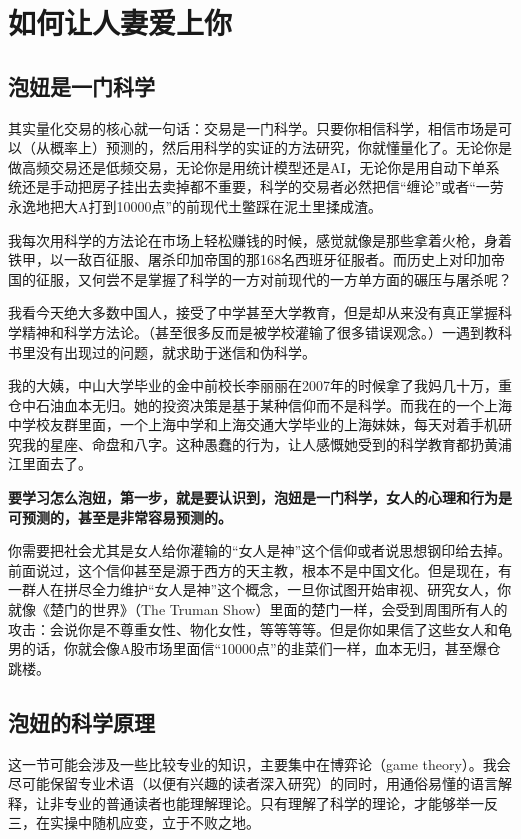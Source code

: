 \chapter{如何让人妻爱上你}

\section{泡妞是一门科学}

其实量化交易的核心就一句话：交易是一门科学。只要你相信科学，相信市场是可以（从概率上）预测的，然后用科学的实证的方法研究，你就懂量化了。无论你是做高频交易还是低频交易，无论你是用统计模型还是AI，无论你是用自动下单系统还是手动把房子挂出去卖掉都不重要，科学的交易者必然把信``缠论''或者``一劳永逸地把大A打到10000点''的前现代土鳖踩在泥土里揉成渣。

我每次用科学的方法论在市场上轻松赚钱的时候，感觉就像是那些拿着火枪，身着铁甲，以一敌百征服、屠杀印加帝国的那168名西班牙征服者。而历史上对印加帝国的征服，又何尝不是掌握了科学的一方对前现代的一方单方面的碾压与屠杀呢？

我看今天绝大多数中国人，接受了中学甚至大学教育，但是却从来没有真正掌握科学精神和科学方法论。（甚至很多反而是被学校灌输了很多错误观念。）一遇到教科书里没有出现过的问题，就求助于迷信和伪科学。

我的大姨，中山大学毕业的金中前校长李丽丽在2007年的时候拿了我妈几十万，重仓中石油血本无归。她的投资决策是基于某种信仰而不是科学。而我在的一个上海中学校友群里面，一个上海中学和上海交通大学毕业的上海妹妹，每天对着手机研究我的星座、命盘和八字。这种愚蠢的行为，让人感慨她受到的科学教育都扔黄浦江里面去了。

\textbf{要学习怎么泡妞，第一步，就是要认识到，泡妞是一门科学，女人的心理和行为是可预测的，甚至是非常容易预测的。}

你需要把社会尤其是女人给你灌输的``女人是神''这个信仰或者说思想钢印给去掉。前面说过，这个信仰甚至是源于西方的天主教，根本不是中国文化。但是现在，有一群人在拼尽全力维护``女人是神''这个概念，一旦你试图开始审视、研究女人，你就像《楚门的世界》（The Truman Show）里面的楚门一样，会受到周围所有人的攻击：会说你是不尊重女性、物化女性，等等等等。但是你如果信了这些女人和龟男的话，你就会像A股市场里面信``10000点''的韭菜们一样，血本无归，甚至爆仓跳楼。

\section{泡妞的科学原理}

这一节可能会涉及一些比较专业的知识，主要集中在博弈论（game theory）。我会尽可能保留专业术语（以便有兴趣的读者深入研究）的同时，用通俗易懂的语言解释，让非专业的普通读者也能理解理论。只有理解了科学的理论，才能够举一反三，在实操中随机应变，立于不败之地。

